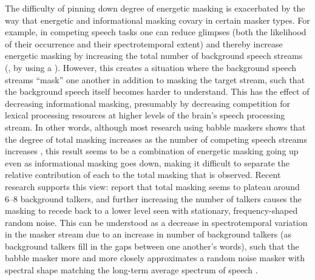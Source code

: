 The difficulty of pinning down degree of energetic masking is exacerbated by the way that energetic and informational masking covary in certain masker types.  For example, in competing speech tasks one can reduce glimpses (both the likelihood of their occurrence and their spectrotemporal extent) and thereby increase energetic masking by increasing the total number of background speech streams (\ie, by using a ).  However, this creates a situation where the background speech streams “mask” one another in addition to masking the target stream, such that the background speech itself becomes harder to understand.  This has the effect of decreasing informational masking, presumably by decreasing competition for lexical processing resources at higher levels of the brain’s speech processing stream.  In other words, although most research using babble maskers shows that the degree of total masking increases as the number of competing speech streams increases \citep[\eg][]{Miller1947, BrungartEtAl2001}, this result seems to be a combination of energetic masking going up even as informational masking goes down, making it difficult to separate the relative contribution of each to the total masking that is observed.  Recent research supports this view: \citet{SimpsonCooke2005} report that total masking seems to plateau around 6–8 background talkers, and further increasing the number of talkers causes the masking to recede back to a lower level seen with stationary, frequency-shaped random noise.  %
This can be understood as a decrease in spectrotemporal variation in the masker stream due to an increase in number of background talkers (as background talkers fill in the gaps between one another’s words), such that the babble masker more and more closely approximates a random noise masker with spectral shape matching the long-term average spectrum of speech \citep{SimpsonCooke2005}.

